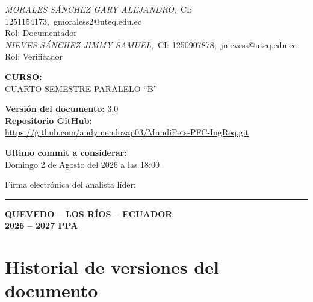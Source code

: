 \documentclass[journal,onecolumn]{IEEEtran}
\begin{document}
\begin{titlepage}
		\textit{MORALES SÁNCHEZ GARY ALEJANDRO},~CI: 1251154173,~gmoraless2@uteq.edu.ec\\
		{\small Rol: Documentador}\\[6pt]
		
		\textit{NIEVES SÁNCHEZ JIMMY SAMUEL},~CI: 1250907878,~jnievess@uteq.edu.ec\\
		{\small Rol: Verificador}
		
		\vspace{0.2cm}
		
		{\normalsize\bfseries CURSO:}\\[4pt]
		{\normalsize CUARTO SEMESTRE PARALELO \enquote{B}}
		
		\vspace{0.2cm}
		
		{\normalsize\bfseries Versión del documento:} 3.0\\[4pt]
		\textbf{Repositorio GitHub:}\\
		\url{https://github.com/andymendozap03/MundiPets-PFC-IngReq.git}
		
		\textbf{Ultimo commit a considerar:}\\
		\normalsize Domingo 2 de Agosto del 2026 a las 18:00
		
		\vspace{1.8cm}
		
		{\small Firma electrónica del analista líder: \rule{5cm}{0.4pt}}
		
		{\normalsize\bfseries QUEVEDO -- LOS RÍOS -- ECUADOR}\\[4pt]
		{\normalsize\bfseries 2026 -- 2027 PPA}
		
	\end{titlepage}
	
	\section*{Historial de versiones del documento}
	
\end{document}
